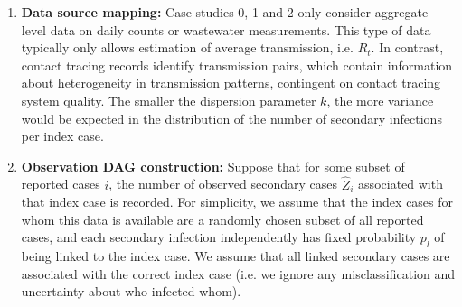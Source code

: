 \documentclass{article}
\begin{document}
\begin{enumerate}
    \item \textbf{Data source mapping:} Case studies 0, 1 and 2 only consider aggregate-level data on daily counts or wastewater measurements. This type of data typically only allows estimation of average transmission, i.e. $R_t$. In contrast, contact tracing records identify transmission pairs, which contain information about heterogeneity in transmission patterns, contingent on contact tracing system quality. The smaller the dispersion parameter $k$, the more variance would be expected in the distribution of the number of secondary infections per index case.
    \item \textbf{Observation DAG construction:} Suppose that for some subset of reported cases $i$, the number of observed secondary cases $\hat{Z}_i$ associated with that index case is recorded. For simplicity, we assume that the index cases for whom this data is available are a randomly chosen subset of all reported cases, and each secondary infection independently has fixed probability $p_l$ of being linked to the index case. We assume that all linked secondary cases are associated with the correct index case (i.e. we ignore any misclassification and uncertainty about who infected whom). 


\end{enumerate}
\end{document}
